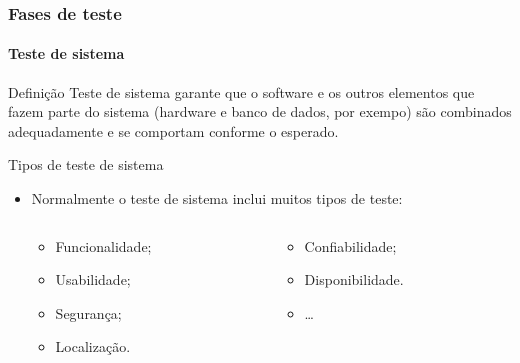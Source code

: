 \begin{frame}
\label{concept:system-testing}
\frametitle{Fases de teste}
\framesubtitle{Teste de sistema}

\begin{block:concept}{Definição}
Teste de sistema garante que o software e os outros elementos que fazem parte do sistema (hardware e banco de dados, por exempo) são combinados adequadamente e se comportam conforme o esperado.
\end{block:concept}

\begin{block:fact}{Tipos de teste de sistema}
\begin{itemize}
	\item Normalmente o teste de sistema inclui muitos tipos de teste:
	\begin{columns}[t, totalwidth=9.0cm]
		\begin{column}[t]{3cm}
			\begin{itemize}
				\item Funcionalidade;
				\item Usabilidade;
				\item Segurança;
				\item Localização.
			\end{itemize}
		\end{column}

		\begin{column}[t]{4cm}
			\begin{itemize}
				\item Confiabilidade;
				\item Disponibilidade.
				\item \ldots
			\end{itemize}
		\end{column}
	\end{columns}
\end{itemize}
\end{block:fact}

\hfill
{}
\end{frame}



